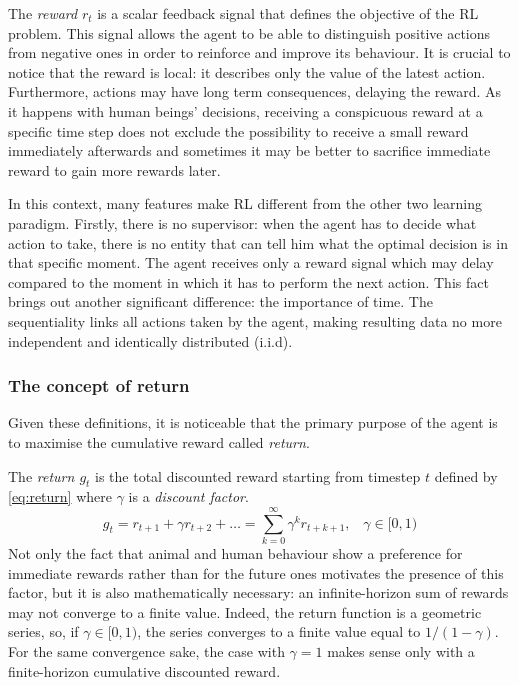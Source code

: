 The \textit{reward} $r_t$ is a scalar feedback signal that defines the objective of the RL problem. This signal allows the agent to be able to distinguish positive actions from negative ones in order to reinforce and improve its behaviour. It is crucial to notice that the reward is local: it describes only the value of the latest action. Furthermore, actions may have long term consequences, delaying the reward. As it happens with human beings' decisions, receiving a conspicuous reward at a specific time step does not exclude the possibility to receive a small reward immediately afterwards and sometimes it may be better to sacrifice immediate reward to gain more rewards later.

In this context, many features make RL different from the other two learning paradigm.
Firstly, there is no supervisor: when the agent has to decide what action to take, there is no entity that can tell him what the optimal decision is in that specific moment. The agent receives only a reward signal which may delay compared to the moment in which it has to perform the next action.
This fact brings out another significant difference: the importance of time. The sequentiality links all actions taken by the agent, making resulting data no more independent and identically distributed (i.i.d).

\subsubsection{The concept of return}

Given these definitions, it is noticeable that the primary purpose of the agent is to maximise the cumulative reward called \textit{return}.


The \textit{return $g_t$} is the total discounted reward starting from timestep $t$ defined by \vref{eq:return} where $\gamma$ is a \textit{discount factor}.
\begin{equation} \label{eq:return}
	g_t = r_{t+1} + \gamma r_{t+2} + \dots = \sum_{k=0}^{\infty} \gamma^k r_{t+k+1}, \;\;\;\gamma \in [0,1)
\end{equation}
Not only the fact that animal and human behaviour show a preference for immediate rewards rather than for the future ones motivates the presence of this factor, but it is also mathematically necessary: an infinite-horizon sum of rewards may not converge to a finite value. Indeed, the return function is a geometric series, so, if $\gamma \in [0,1)$, the series converges to a finite value equal to $1/(1-\gamma)$. For the same convergence sake, the case with $\gamma = 1$ makes sense only with a finite-horizon cumulative discounted reward.

